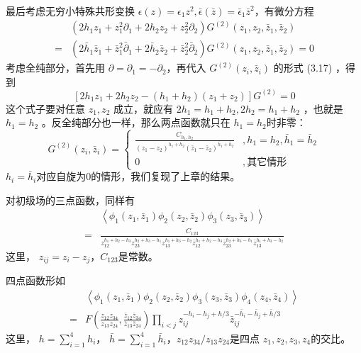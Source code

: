 最后考虑无穷小特殊共形变换 $\epsilon(z)=\epsilon_{1} z^{2}, \bar{\epsilon}(\bar{z})=\bar{\epsilon}_{1} \bar{z}^{2} $，有微分方程
\begin{equation}
\begin{aligned} &\left(2 h_{1} z_{1}+z_{1}^{2} \partial_{1}+2 h_{2} z_{2}+z_{2}^{2} \partial_{2}\right) G^{(2)}\left(z_{1}, z_{2}, \bar{z}_{1}, \bar{z}_{2}\right) \\ =&\left(2 \bar{h}_{1} \bar{z}_{1}+\bar{z}_{1}^{2} \bar{\partial}_{1}+2 \bar{h}_{2} \bar{z}_{2}+\bar{z}_{2}^{2} \bar{\partial}_{2}\right) G^{(2)}\left(z_{1}, z_{2}, \bar{z}_{1}, \bar{z}_{2}\right)=0 \end{aligned}
\end{equation}
考虑全纯部分，首先用 $\partial=\partial_{1}=-\partial_{2} $，再代入 $G^{(2)}\left(z_{i}, \bar{z}_{i}\right)$ 的形式 (3.17) ，得到
\[
\left[2 h_{1} z_{1}+2 h_{2} z_{2}-\left(h_{1}+h_{2}\right)\left(z_{1}+z_{2}\right)\right] G^{(2)}=0
\]
这个式子要对任意 $z_1,z_2$ 成立，就应有 $2 h_{1}=h_{1}+h_{2}, 2 h_{2}=h_{1}+h_{2}$ ，也就是$ h_1=h_2$ 。反全纯部分也一样，那么两点函数就只在 $h_1=h_2 $时非零：
\begin{equation}
G^{(2)}\left(z_{i}, \bar{z}_{i}\right)=\left\{\begin{array}{cl} \frac{C_{h_{1}, h_{2}}}{\left(z_{1}-z_{2}\right)^{h_{1}+h_{2}}\left(\bar{z}_{1}-\bar{z}_{2}\right)^{\bar{h}_{1}+\bar{h}_{2}}}&, h_{1}=h_{2}, \bar{h}_{1}=\bar{h}_{2} \\ 0 &,其它情形 \end{array}
\right.\end{equation}
$h_i=\bar{h}_i $对应自旋为0的情形，我们复现了上章的结果。

对初级场的三点函数，同样有
\begin{equation}
\begin{aligned} &\left\langle\phi_{1}\left(z_{1}, \bar{z}_{1}\right) \phi_{2}\left(z_{2}, \bar{z}_{2}\right) \phi_{3}\left(z_{3}, \bar{z}_{3}\right)\right\rangle \\ =& \frac{C_{123}}{z_{12}^{h_{1}+h_{2}-h_{3}} z_{23}^{h_{2}+h_{3}-h_{1}} z_{13}^{h_{1}+h_{3}-h_{2}} \bar{z}_{12}^{\bar{h}_{1}+\bar{h}_{2}-\bar{h}_{3}} \bar{z}_{23}^{\bar{h}_{2}+\bar{h}_{3}-\bar{h}_{1}} \bar{z}_{13}^{\bar{h}_{1}+\bar{h}_{3}-\bar{h}_{2}}} \end{aligned}
\end{equation}
这里， $z_{ij}=z_i-z_j ， C_{123} $是常数。

四点函数形如
\begin{equation}
\begin{aligned} &\left\langle\phi_{1}\left(z_{1}, \bar{z}_{1}\right) \phi_{2}\left(z_{2}, \bar{z}_{2}\right) \phi_{3}\left(z_{3}, \bar{z}_{3}\right) \phi_{4}\left(z_{4}, \bar{z}_{4}\right)\right\rangle \\ =& F\left(\frac{z_{12} z_{34}}{z_{13} z_{24}}, \frac{\bar{z}_{12} \bar{z}_{34}}{\bar{z}_{13} \bar{z}_{24}}\right) \prod_{i<j} z_{i j}^{-h_{i}-h_{j}+h / 3} \bar{z}_{i j}^{-\bar{h}_{i}-\bar{h}_{j}+\bar{h} / 3} \end{aligned}
\end{equation}
这里， $h=\sum_{i=1}^4h_i $， $\bar{h}=\sum_{i=1}^4\bar{h}_i $，$ z_{12}z_{34}/z_{13}z_{24} $是四点 $z_1,z_2,z_3,z_4 $的交比。

